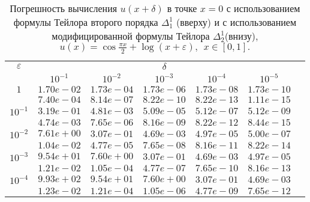 \documentclass[10pt,twoside]{uz_kgu}
\begin{document}
\newpage
\begin{table} [!htb]
		\caption {Погрешность вычисления $u(x+ \delta)$ в точке $x=0$ с использованием формулы Тейлора второго порядка $\Delta_1^1$ (вверху) и с использованием модифицированной формулы Тейлора $\Delta_2^1$(внизу),
		$u(x)=  \cos \frac{\pi x}{2} + \log{(x+\varepsilon)} ,\ \    x\in [0,1].$}
	\begin{center}
		\begin{tabular}{|c|c|c|c|c|c|c}
			\cline{1-6} $\varepsilon$ & \multicolumn{5}{c|}{$\delta$} \\
			\cline{2-6} &$10^{-1}$ & $10^{-2}$ & $10^{-3}$  & $10^{-4}$& $10^{-5}$\\
			\cline{1-6}
			$1$
			&$1.70e-02$&$1.73e-04$&$1.73e-06$&$1.73e-08$& $1.73e-10$\\
			&$7.40e-04$&$8.14e-07$&$8.22e-10$&$8.22e-13$& $1.11e-15$\\
			\cline{1-6}
			$10^{-1}$
			&$3.19e-01$&$4.81e-03$&$5.09e-05$&$5.12e-07$&$5.12e-09$\\
			&$4.74e-03$&$7.65e-06$&$8.16e-09$&$8.22e-12$&$8.44e-15$\\
			\cline{1-6}
			$10^{-2}$
			&$7.61e+00$&$3.07e-01$&$4.69e-03$&$4.97e-05$&$5.00e-07$\\
			&$1.04e-02$&$4.77e-05$&$7.65e-08$&$8.16e-11$&$8.22e-14$\\
			\cline{1-6}
			$10^{-3}$
			&$9.54e+01$&$7.60e+00$&$3.07e-01$&$4.69e-03$&$4.97e-05$\\
			&$1.21e-02$&$1.05e-04$&$4.77e-07$&$7.65e-10$&$8.16e-13$\\
			\cline{1-6}
			$10^{-4}$
			&$9.93e+02$&$9.54e+01$&$7.60e+00$&$3.07e-01$&$4.69e-03$\\
			&$1.23e-02$&$1.21e-04$&$1.05e-06$&$4.77e-09$&$7.65e-12$\\
			\cline{1-6}
		\end{tabular}
	\end{center}
\end{table}
\end{document}
